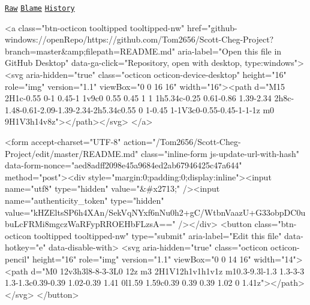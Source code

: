   \href{/Tom2656/Scott-Cheg-Project/raw/master/README.md}{\tt Raw} \href{/Tom2656/Scott-Cheg-Project/blame/master/README.md}{\tt Blame} \href{/Tom2656/Scott-Cheg-Project/commits/master/README.md}{\tt History}  \begin{DoxyVerb}<a class="btn-octicon tooltipped tooltipped-nw"
   href="github-windows://openRepo/https://github.com/Tom2656/Scott-Cheg-Project?branch=master&amp;filepath=README.md"
   aria-label="Open this file in GitHub Desktop"
   data-ga-click="Repository, open with desktop, type:windows">
    <svg aria-hidden="true" class="octicon octicon-device-desktop" height="16" role="img" version="1.1" viewBox="0 0 16 16" width="16"><path d="M15 2H1c-0.55 0-1 0.45-1 1v9c0 0.55 0.45 1 1 1h5.34c-0.25 0.61-0.86 1.39-2.34 2h8c-1.48-0.61-2.09-1.39-2.34-2h5.34c0.55 0 1-0.45 1-1V3c0-0.55-0.45-1-1-1z m0 9H1V3h14v8z"></path></svg>
</a>

<form accept-charset="UTF-8" action="/Tom2656/Scott-Cheg-Project/edit/master/README.md" class="inline-form js-update-url-with-hash" data-form-nonce="aed8adff2098e45a9684ed2ab67946425c47a644" method="post"><div style="margin:0;padding:0;display:inline"><input name="utf8" type="hidden" value="&#x2713;" /><input name="authenticity_token" type="hidden" value="kHZEltsSP6h4XAn/SekVqNYxf6nNu0h2+gC/WtbnVaazU+G33obpDC0ubuLcFRMi8mgczWaRFypRROEHbFLzsA==" /></div>
  <button class="btn-octicon tooltipped tooltipped-nw" type="submit"
    aria-label="Edit this file" data-hotkey="e" data-disable-with>
    <svg aria-hidden="true" class="octicon octicon-pencil" height="16" role="img" version="1.1" viewBox="0 0 14 16" width="14"><path d="M0 12v3h3l8-8-3-3L0 12z m3 2H1V12h1v1h1v1z m10.3-9.3l-1.3 1.3-3-3 1.3-1.3c0.39-0.39 1.02-0.39 1.41 0l1.59 1.59c0.39 0.39 0.39 1.02 0 1.41z"></path></svg>
  </button>
\end{DoxyVerb}
